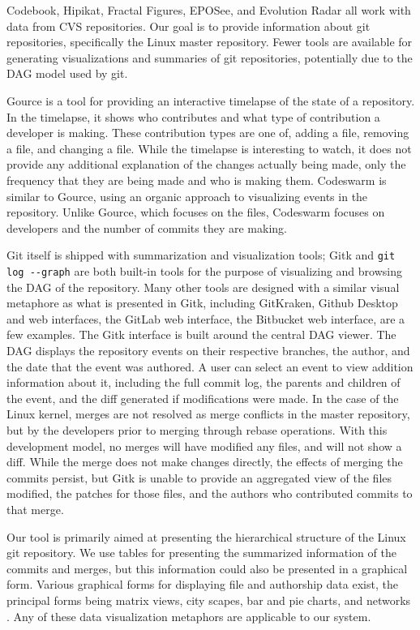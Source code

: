 Codebook, Hipikat, Fractal Figures, EPOSee, and Evolution Radar all work
with data from CVS repositories. Our goal is to provide information
about git repositories, specifically the Linux master repository. Fewer
tools are available for generating visualizations and summaries of git
repositories, potentially due to the DAG model used by git.

Gource is a tool for providing an interactive timelapse of the state of
a repository\cite{Caudwell2010}. In the timelapse, it shows who
contributes and what type of contribution a developer is making. These
contribution types are one of, adding a file, removing a file, and
changing a file. While the timelapse is interesting to watch, it does
not provide any additional explanation of the changes actually being
made, only the frequency that they are being made and who is making
them. Codeswarm\cite{ogawa09} is similar to Gource, using an organic
approach to visualizing events in the repository. Unlike Gource, which
focuses on the files, Codeswarm focuses on developers and the number of
commits they are making.

Git itself is shipped with summarization and visualization tools; Gitk
and \verb|git log --graph| are both built-in tools for the purpose of
visualizing and browsing the DAG of the repository. Many other tools are
designed with a similar visual metaphore as what is presented in Gitk,
including GitKraken, Github Desktop and web interfaces, the GitLab web
interface, the Bitbucket web interface, are a few examples. The Gitk
interface is built around the central DAG viewer. The DAG displays the
repository events on their respective branches, the author, and the date
that the event was authored. A user can select an event to view addition
information about it, including the full commit log, the parents and
children of the event, and the diff generated if modifications were
made. In the case of the Linux kernel, merges are not resolved as merge
conflicts in the master repository, but by the developers prior to
merging through rebase operations. With this development model, no
merges will have modified any files, and will not show a diff. While the
merge does not make changes directly, the effects of merging the commits
persist, but Gitk is unable to provide an aggregated view of the files
modified, the patches for those files, and the authors who contributed
commits to that merge.

Our tool is primarily aimed at presenting the hierarchical structure of
the Linux git repository. We use tables for presenting the summarized
information of the commits and merges, but this information could also
be presented in a graphical form. Various graphical forms for displaying
file and authorship data exist, the principal forms being matrix views,
city scapes, bar and pie charts, and networks \cite{Eick2002}. Any of
these data visualization metaphors are applicable to our system.

